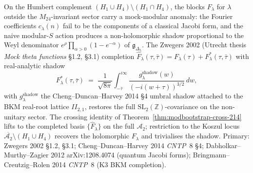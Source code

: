 \begin{remark}
\label{rem:modbootstrap-cross-zwegers}
On the Humbert complement
$(H_1\cup H_4)\setminus(H_1\cap H_4)$, the blocks
$F_\lambda$ for $\lambda$ outside the
$M_{24}$-invariant sector carry a mock-modular anomaly: the
Fourier coefficients $c_\lambda(n)$ fail to be the components of
a classical Jacobi form, and the naive modular-$S$ action
produces a non-holomorphic shadow proportional to the Weyl
denominator $e^\rho\prod_{\alpha>0}(1 - e^{-\alpha})$ of
$\mathfrak g_{\Delta_5}$. The Zwegers 2002 (Utrecht thesis
\emph{Mock theta functions} \S 1.2, \S 3.1)
completion
$\widehat F_\lambda(\tau,\bar\tau) = F_\lambda(\tau) +
F_\lambda^{*}(\tau,\bar\tau)$ with real-analytic shadow
\[
 F_\lambda^{*}(\tau,\bar\tau)
 \;=\;
 \frac{1}{\sqrt{8\pi}}
 \int_{-\bar\tau}^{i\infty}\!\!
 \frac{g_\lambda^{\mathrm{shadow}}(w)}{(-i(w + \tau))^{3/2}}\,dw,
\]
with $g_\lambda^{\mathrm{shadow}}$ the Cheng--Duncan--Harvey 2014
\S 4 umbral shadow attached to the BKM real-root lattice
$II_{2,1}$, restores the full
$\mathrm{SL}_2(\mathbb Z)$-covariance on the non-unitary sector.
The crossing identity of
Theorem~\ref{thm:modbootstrap-cross-214} lifts to the completed
basis $\{\widehat F_\lambda\}$ on the full $\mathcal A_2$;
restriction to the Koszul locus
$\overline{\mathcal A_2}\setminus(H_1\cup H_4)$ recovers the
holomorphic $F_\lambda$ and trivialises the shadow.
Primary: Zwegers 2002 \S 1.2, \S 3.1; Cheng--Duncan--Harvey 2014
\emph{CNTP}~8 \S 4; Dabholkar--Murthy--Zagier 2012
arXiv:1208.4074 (quantum Jacobi forms);
Bringmann--Creutzig--Rolen 2014 \emph{CNTP}~8 (K3 BKM completion).
\end{remark}
